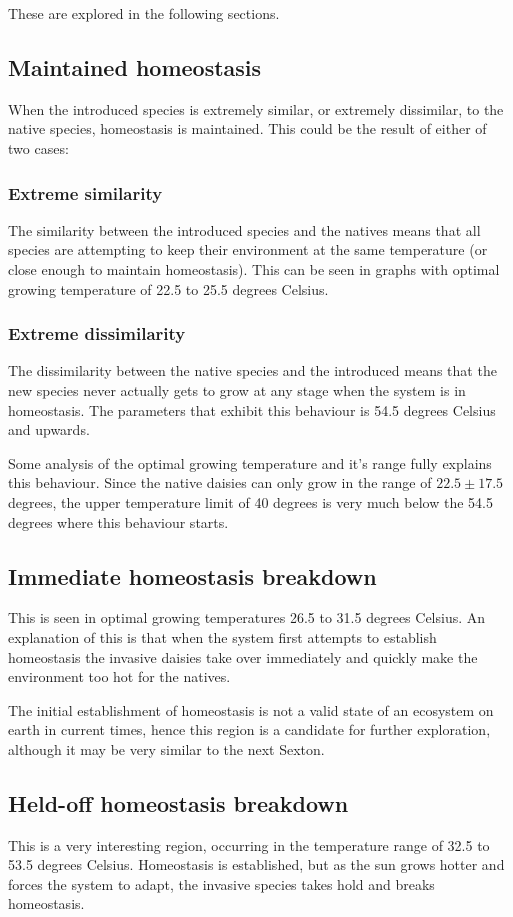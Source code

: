 \documentclass[12pt]{article}
\begin{document}
These are explored in the following sections.

\subsection{Maintained homeostasis}
When the introduced species is extremely similar, or extremely
dissimilar, to the native species, homeostasis is maintained. This
could be the result of either of two cases:
\subsubsection{Extreme similarity}
The similarity between the introduced species and the natives means
that all species are attempting to keep their environment at the same
temperature (or close enough to maintain homeostasis). This can be
seen in graphs with optimal growing temperature of 22.5 to 25.5
degrees Celsius.

\subsubsection{Extreme dissimilarity}
The dissimilarity between the native species and the introduced means
that the new species never actually gets to grow at any stage when the
system is in homeostasis. The parameters that exhibit this behaviour
is 54.5 degrees Celsius and upwards.

Some analysis of the optimal growing temperature and it's range fully
explains this behaviour. Since the native daisies can only grow in the
range of $22.5 \pm 17.5$ degrees, the upper temperature limit of 40
degrees is very much below the 54.5 degrees where this behaviour starts.
\subsection{Immediate homeostasis breakdown}
This is seen in optimal growing temperatures 26.5 to 31.5 degrees
Celsius. An explanation of this is that when the system first attempts
to establish homeostasis the invasive daisies take over immediately
and quickly make the environment too hot for the natives.

The initial establishment of homeostasis is not a valid state of an
ecosystem on earth in current times, hence this region is a candidate
for further exploration, although it may be very similar to the next Sexton.

\subsection{Held-off homeostasis breakdown}
This is a very interesting region, occurring in the temperature range
of 32.5 to 53.5 degrees Celsius. Homeostasis is established, but as
the sun grows hotter and forces the system to adapt, the invasive
species takes hold and breaks homeostasis.
\end{document}
